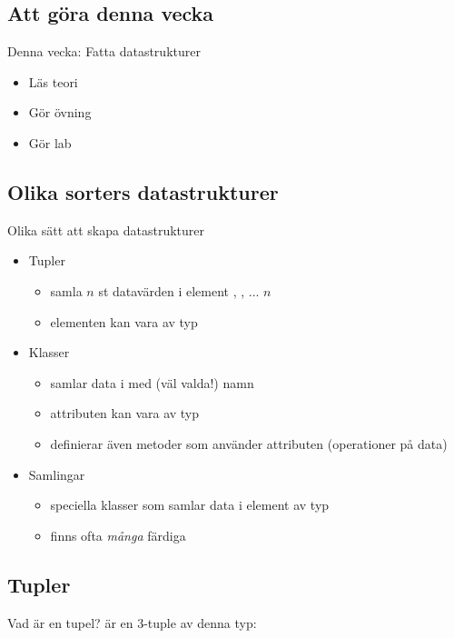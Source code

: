 
\subsection{Att göra denna vecka}
\begin{Slide}{Denna vecka: Fatta datastrukturer}
\begin{itemize}
\item Läs teori
\item Gör övning 
\item Gör lab 
\end{itemize}
\end{Slide}

\subsection{Olika sorters datastrukturer}

\begin{Slide}{Olika sätt att skapa datastrukturer}
\begin{itemize}
\item Tupler
  \begin{itemize}
  \item samla $n$ st datavärden i element , , ...  \code{_}$n$
  \item elementen kan vara av  typ
  \end{itemize}
\item Klasser   
  \begin{itemize}
  \item samlar data i  med (väl valda!) namn
  \item attributen kan vara av  typ
  \item definierar även metoder som använder attributen (operationer på data)
  \end{itemize}

\item Samlingar 
  \begin{itemize}
  \item speciella klasser som samlar data i element av  typ
  \item finns ofta \emph{många} färdiga  
  \end{itemize}
\end{itemize}
\end{Slide}

\subsection{Tupler}

\begin{Slide}{Vad är en tupel?}
 är en 3-tuple av denna typ: 
\end{Slide}




